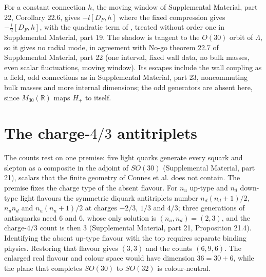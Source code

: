 \documentclass[aps,prd,reprint,onecolumn,nofootinbib,amsmath,amssymb,floatfix]{revtex4-2}
\theoremstyle{plain}
\newcommand{\supp}[1]{Supplemental Material, part #1}
\begin{document}
For a constant connection $h$, the moving window of \supp{22}, Corollary 22.6, gives $-l[D_F,h]$ where the fixed compression gives $-\frac l2[D_F,h]$, with the quadratic term of \cite{CCvS2013a}, treated without order one in \supp{19}. The shadow is tangent to the $O(30)$ orbit of $\Lambda$, so it gives no radial mode, in agreement with No-go theorem 22.7 of \supp{22} (one interval, fixed wall data, no bulk masses, even scalar fluctuations, moving window). Its escapes include the wall coupling as a field, odd connections as in \supp{23}, noncommuting bulk masses and more internal dimensions; the odd generators are absent here, since $M_{30}(\mathbb R)$ maps $H_+$ to itself.

\section{The charge-\texorpdfstring{$4/3$}{4/3} antitriplets}\label{sec:exotic}

The counts rest on one premise: five light quarks generate every squark and slepton as a composite in the adjoint of $SO(30)$ (\supp{21}), scalars that the finite geometry of Connes et al. does not contain. The premise fixes the charge type of the absent flavour. For $n_u$ up-type and $n_d$ down-type light flavours the symmetric diquark antitriplets number $n_d(n_d+1)/2$, $n_un_d$ and $n_u(n_u+1)/2$ at charges $-2/3$, $1/3$ and $4/3$; three generations of antisquarks need $6$ and $6$, whose only solution is $(n_u,n_d)=(2,3)$, and the charge-$4/3$ count is then $3$ (\supp{21}, Proposition 21.4). Identifying the absent up-type flavour with the top requires separate binding physics. Restoring that flavour gives $(3,3)$ and the counts $(6,9,6)$. The enlarged real flavour and colour space would have dimension $36=30+6$, while the plane that completes $SO(30)$ to $SO(32)$ is colour-neutral.
\end{document}

